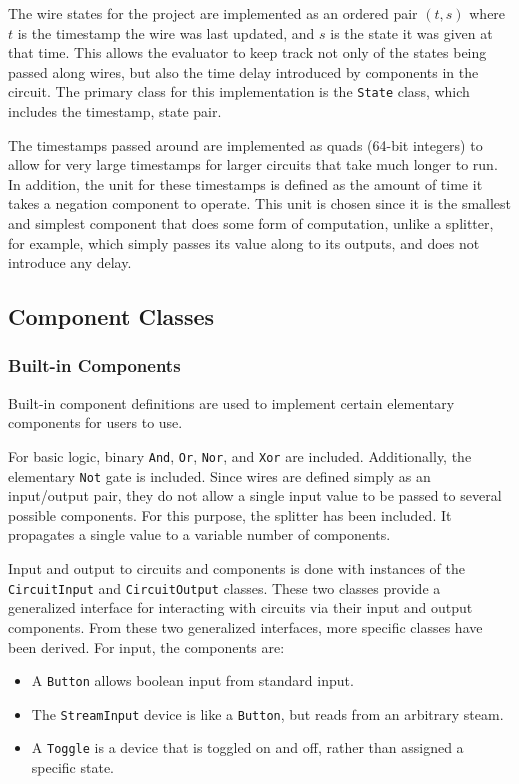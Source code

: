 \documentclass{article}
\newcommand{\ClassName}[1]{\texttt{#1}}
\begin{document}
The wire states for the project are implemented as an ordered pair $(t,s)$ where $t$ is the timestamp the wire was last updated, and $s$ is the state it was given at that time. This allows the evaluator to keep track not only of the states being passed along wires, but also the time delay introduced by components in the circuit. The primary class for this implementation is the \ClassName{State} class, which includes the timestamp, state pair.

The timestamps passed around are implemented as quads (64-bit integers) to allow for very large timestamps for larger circuits that take much longer to run. In addition, the unit for these timestamps is defined as the amount of time it takes a negation component to operate. This unit is chosen since it is the smallest and simplest component that does some form of computation, unlike a splitter, for example, which simply passes its value along to its outputs, and does not introduce any delay.

\subsection{Component Classes}

\subsubsection{Built-in Components}

Built-in component definitions are used to implement certain elementary components for users to use.

For basic logic, binary \ClassName{And}, \ClassName{Or}, \ClassName{Nor}, and \ClassName{Xor} are included. Additionally,  the elementary \ClassName{Not} gate is included. Since wires are defined simply as an input/output pair, they do not allow a single input value to be passed to several possible components. For this purpose, the splitter has been included. It propagates a single value to a variable number of components.

Input and output to circuits and components is done with instances of the \ClassName{CircuitInput} and \ClassName{CircuitOutput} classes. These two classes provide a generalized interface for interacting with circuits via their input and output components. From these two generalized interfaces, more specific classes have been derived. For input, the components are:

\begin{itemize}

\item A \ClassName{Button} allows boolean input from standard input.

\item The \ClassName{StreamInput} device is like a \ClassName{Button}, but reads from an arbitrary steam.

\item A \ClassName{Toggle} is a device that is toggled on and off, rather than assigned a specific state.

\end{itemize}
\end{document}
